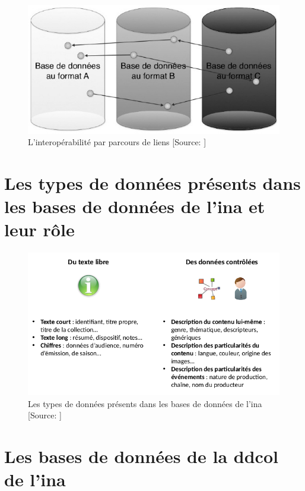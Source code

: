 \begin{figure}[!h]
	\centering
	\includegraphics[width=12cm]{images/interop_follow_nose.jpeg}
	\medskip
	\caption[L'interopérabilité par parcours de liens]{L'interopérabilité par parcours de liens [Source: \cite{bermes_2_2013}]}
	\label{interop_follow_nose}
\end{figure}

\chapter{\label{annexe_type_donnees_axel}Les types de données présents dans les bases de données de l'\ac{ina} et leur rôle}

\begin{figure}[!h]
	\centering
	\includegraphics[width=15cm]{images/type_donnees_axel.png}
	\medskip
	\caption[Les types de données présents dans les bases de données de l'\ac{ina}]{Les types de données présents dans les bases de données de l'\ac{ina} [Source: \cite[p.6]{roche-diore_atelier_2020}]}
	\label{type_donnees_axel}
\end{figure}

\chapter{\label{annexe_bdd_ina}Les bases de données de la \ac{ddcol} de l'\ac{ina}}

